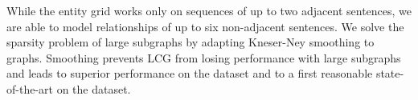 While the entity grid works only on sequences of up to two adjacent sentences, we are able to model relationships of up to six non-adjacent sentences. 
We solve the sparsity problem of large subgraphs by adapting \mbox{Kneser-Ney} smoothing to graphs. 
Smoothing prevents LCG from losing performance with large subgraphs and leads to superior performance on the  dataset and to a first reasonable \mbox{state-of-the-art} on the  dataset.
